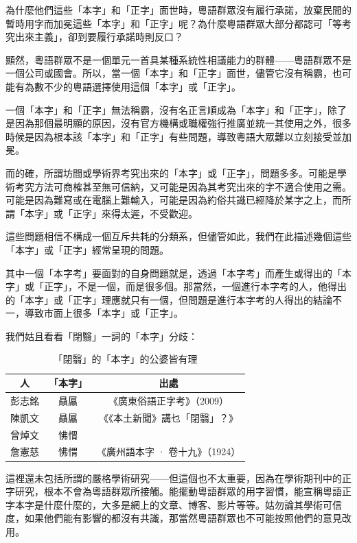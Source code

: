 \documentclass[a5paper, 12pt, openany]{book} %
\begin{document}
為什麼他們這些「本字」和「正字」面世時，粵語群眾沒有履行承諾，放棄民間的暫時用字而加冕這些「本字」和「正字」呢？為什麼粵語群眾大部分都認可「等考究出來主義」，卻到要履行承諾時則反口？

顯然，粵語群眾不是一個單元一首具某種系統性相議能力的群體——粵語群眾不是一個公司或國會。所以，當一個「本字」和「正字」面世，儘管它沒有稱霸，也可能有為數不少的粵語選擇使用這個「本字」或「正字」。

一個「本字」和「正字」無法稱霸，沒有名正言順成為「本字」和「正字」，除了是因為那個最明顯的原因，沒有官方機構或職權強行推廣並統一其使用之外，很多時候是因為根本該「本字」和「正字」有些問題，導致粵語大眾難以立刻接受並加冕。

而的確，所謂坊間或學術界考究出來的「本字」或「正字」，問題多多。可能是學術考究方法可商榷甚至無可信納，又可能是因為其考究出來的字不適合使用之需。可能是因為難寫或在電腦上難輸入，可能是因為約俗共識已經降於某字之上，而所謂「本字」或「正字」來得太遲，不受歡迎。

這些問題相信不構成一個互斥共耗的分類系，但儘管如此，我們在此描述幾個這些「本字」或「正字」經常呈現的問題。

其中一個「本字考」要面對的自身問題就是，透過「本字考」而產生或得出的「本字」或「正字」，不是一個，而是很多個。那當然，一個進行本字考的人，他得出的「本字」或「正字」理應就只有一個，但問題是進行本字考的人得出的結論不一，導致市面上很多「本字」或「正字」。

我們姑且看看「閉翳」一詞的「本字」分歧：

\begin{table}[h!]
\centering
\begin{tabular}{|c|c|c|}
\hline
\textbf{人} & \textbf{「本字」} & \textbf{出處} \\ \hline
彭志銘 & 贔屭 & 《廣東俗語正字考》（2009） \\ \hline
陳凱文 & 贔屭 & 《《本土新聞》講乜「閉翳」？》 \\ \hline
曾焯文 & 怫㥜 & \\ \hline
詹憲慈 & 怫㥜 & 《廣州語本字 · 卷十九》（1924） \\ \hline
\end{tabular}
\caption{「閉翳」的「本字」的公婆皆有理}
\end{table}

這裡還未包括所謂的嚴格學術研究——但這個也不太重要，因為在學術期刊中的正字研究，根本不會為粵語群眾所接觸。能擺動粵語群眾的用字習慣，能宣稱粵語正字本字是什麼什麼的，大多是網上的文章、博客、影片等等。姑勿論其學術可信度，如果他們能有影響的都沒有共識，那當然粵語群眾也不可能按照他們的意見改用。
\end{document}
